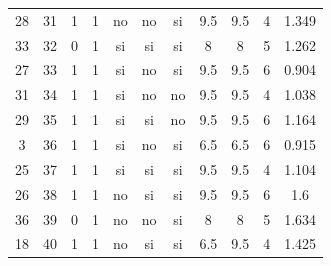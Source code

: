 \documentclass[12pt,a4paper,twoside,openright,titlepage,final]{article}
\begin{document}
\begin{appendices}
\begin{landscape}
\begin{center}
\begin{longtable}{@{\extracolsep{\fill}}*{11}{c}}
					28       & 31           & 1         & 1       & no   & no        & si           & 9.5        & 9.5           & 4             & 1.349  \\
					33       & 32           & 0         & 1       & si   & si        & si           & 8          & 8             & 5             & 1.262  \\
					27       & 33           & 1         & 1       & si   & no        & si           & 9.5        & 9.5           & 6             & 0.904  \\
					31       & 34           & 1         & 1       & si   & no        & no           & 9.5        & 9.5           & 4             & 1.038  \\
					29       & 35           & 1         & 1       & si   & si        & no           & 9.5        & 9.5           & 6             & 1.164  \\
					3        & 36           & 1         & 1       & si   & no        & si           & 6.5        & 6.5           & 6             & 0.915  \\
					25       & 37           & 1         & 1       & si   & si        & si           & 9.5        & 9.5           & 4             & 1.104  \\
					26       & 38           & 1         & 1       & no   & si        & si           & 9.5        & 9.5           & 6             & 1.6    \\
					36       & 39           & 0         & 1       & no   & no        & si           & 8          & 8             & 5             & 1.634  \\
					18       & 40           & 1         & 1       & no   & si        & si           & 6.5        & 9.5           & 4             & 1.425  \\
					
				\end{longtable}
			\end{center}
		\end{landscape}
		
		
		

\end{appendices}
\end{document}
